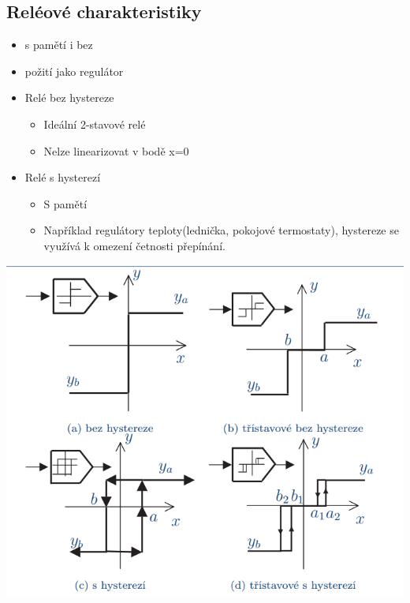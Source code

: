 \subsection*{Reléové charakteristiky}
\begin{itemize}
    \item s pamětí i bez
    \item požití jako regulátor
    \item Relé bez hystereze
          \begin{itemize}
              \item Ideální 2-stavové relé
              \item Nelze linearizovat v bodě x=0
          \end{itemize}
    \item Relé s hysterezí
          \begin{itemize}
              \item S pamětí
              \item Například regulátory teploty(lednička, pokojové termostaty), hystereze se využívá k omezení četnosti přepínání.
          \end{itemize}
\end{itemize}
\includegraphics*{img/rele.png}
